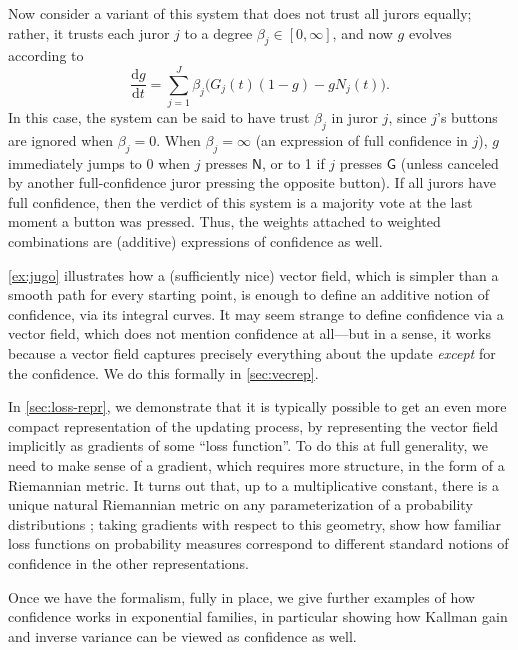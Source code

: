 \begin{example}
Now consider a variant of this system that does
not trust all jurors equally; rather, it trusts each juror $j$
to a degree $\beta_j \in [0, \infty]$, and now $g$ evolves
according to
\[
	\frac{\mathrm dg}{\mathrm dt} = 
	\sum_{j = 1}^J \beta_j \Big( G_j(t) (1-g) 
		- g N_j(t) \Big).
\]
In this case, the system can be said to have trust $\beta_j$ in juror
$j$, since $j$'s buttons are ignored when $\beta_j = 0$. 
When $\beta_j = \infty$ (an expression of full confidence in $j$),
$g$ immediately jumps to 0 when $j$ presses 
$\mathsf N$, or to 1 if $j$ presses $\mathsf G$ (unless canceled by
another full-confidence juror pressing the opposite button).
If all jurors have full confidence, then the verdict of this system is
a majority vote at the last moment a button was pressed. 
Thus, the weights attached to weighted combinations are (additive) expressions 
of confidence as well. 
\end{example}

\cref{ex:jugo} illustrates how a (sufficiently nice) vector field, 
	which is simpler than a smooth path for every starting point, is enough to define
an additive notion of confidence, via its integral curves.
It may seem strange to define confidence via a vector field, which does not mention confidence at all---but in a sense, it works because a vector field captures precisely everything about the update \emph{except} for the confidence. We do this formally in \cref{sec:vecrep}. 

In \cref{sec:loss-repr}, we demonstrate that it is typically possible to get an even more compact representation of the updating process, by representing the vector field implicitly as gradients of some ``loss function''.
To do this at full generality, we need to make sense of a gradient, which requires more structure, in the form of a Riemannian metric.  It turns out that, up to a multiplicative constant, there is a unique natural Riemannian metric on any parameterization of a probability distributions \cite{chentsov}; taking gradients with respect to this geometry, show how familiar loss functions on probability measures correspond to different standard notions of confidence in the other representations.

Once we have the formalism, fully in place, we give further examples of how confidence works in exponential families, in particular showing how Kallman gain and inverse variance can be viewed as confidence as well.


